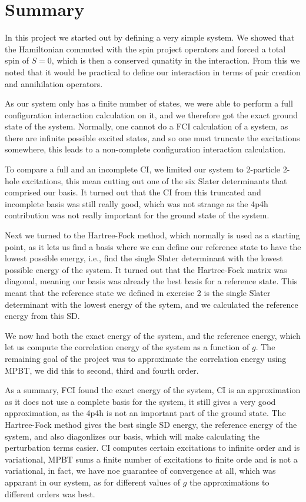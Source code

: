 \documentclass[a4paper, 11pt, notitlepage, english]{article}
\begin{document}
\section*{Summary}

In this project we started out by defining a very simple system. We showed that the Hamiltonian commuted with the spin project operators and forced a total spin of $S=0$, which is then a conserved qunatity in the interaction. From this we noted that it would be practical to define our interaction in terms of pair creation and annihilation operators.

As our system only has a finite number of states, we were able to perform a full configuration interaction calculation on it, and we therefore got the exact ground state of the system. Normally, one cannot do a FCI calculation of a system, as there are infinite possible excited states, and so one must truncate the excitations somewhere, this leads to a non-complete configuration interaction calculation.

To compare a full and an incomplete CI, we limited our system to 2-particle 2-hole excitations, this mean cutting out one of the six Slater determinants that comprised our basis. It turned out that the CI from this truncated and incomplete basis was still really good, which was not strange as the 4p4h contribution was not really important for the ground state of the system.

Next we turned to the Hartree-Fock method, which normally is used as a starting point, as it lets us find a basis where we can define our reference state to have the lowest possible energy, i.e., find the single Slater determinant with the lowest possible energy of the system. It turned out that the Hartree-Fock matrix was diagonal, meaning our basis was already the best basis for a reference state. This meant that the reference state we defined in exercise 2 is the single Slater determinant with the lowest energy of the sytem, and we calculated the reference energy from this SD. 

We now had both the exact energy of the system, and the reference energy, which let us compute the correlation energy of the system as a function of $g$. The remaining goal of the project was to approximate the correlation energy using MPBT, we did this to second, third and fourth order. 

As a summary, FCI found the exact energy of the system, CI is an approximation as it does not use a complete basis for the system, it still gives a very good approximation, as the 4p4h is not an important part of the ground state. The Hartree-Fock method gives the best single SD energy, the reference energy of the system, and also diagonlizes our basis, which will make calculating the perturbation terms easier. CI computes certain excitations to infinite order and is variational, MPBT sums a finite number of excitations to finite orde and is not a variational, in fact, we have noe guarantee of convergence at all, which was apparant in our system, as for different values of $g$ the approximations to different orders was best.
\end{document}
